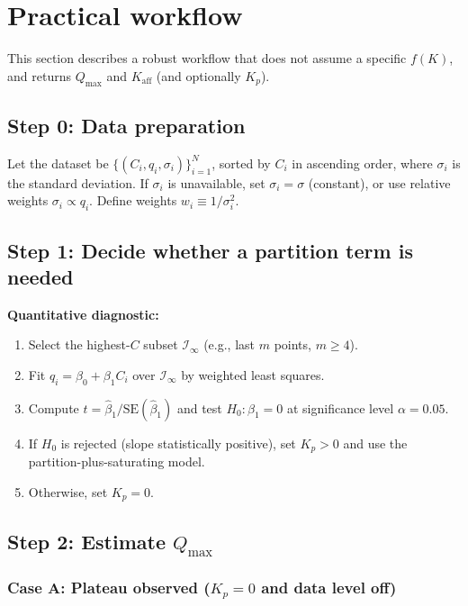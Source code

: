 \documentclass[12pt]{article}
\begin{document}
\section{Practical workflow}

This section describes a robust workflow that does not assume a specific
$f(K)$, and returns $Q_{\max}$ and $K_{\mathrm{aff}}$ (and optionally $K_p$).

\subsection{Step 0: Data preparation}

Let the dataset be $\{(C_i,q_i,\sigma_i)\}_{i=1}^N$, sorted by
$C_i$ in ascending order, where $\sigma_i$ is the standard deviation.
If $\sigma_i$ is unavailable, set $\sigma_i=\sigma$ (constant), or
use relative weights $\sigma_i\propto q_i$.  Define weights
$w_i\equiv 1/\sigma_i^2$.

\subsection{Step 1: Decide whether a partition term is needed}
\label{sec:step1}

\textbf{Quantitative diagnostic:}
\begin{enumerate}[nosep]
  \item Select the highest-$C$ subset $\mathcal{I}_\infty$ (e.g., last $m$ points, $m\ge 4$).
  \item Fit $q_i = \beta_0 + \beta_1 C_i$ over $\mathcal{I}_\infty$ by weighted least squares.
  \item Compute $t = \widehat{\beta}_1 / \mathrm{SE}(\widehat{\beta}_1)$ and test $H_0:\beta_1=0$ at significance level $\alpha=0.05$.
  \item If $H_0$ is rejected (slope statistically positive), set $K_p>0$ and use the partition-plus-saturating model.
  \item Otherwise, set $K_p=0$.
\end{enumerate}

\subsection{Step 2: Estimate $Q_{\max}$}

\subsubsection{Case A: Plateau observed ($K_p=0$ and data level off)}
\end{document}
